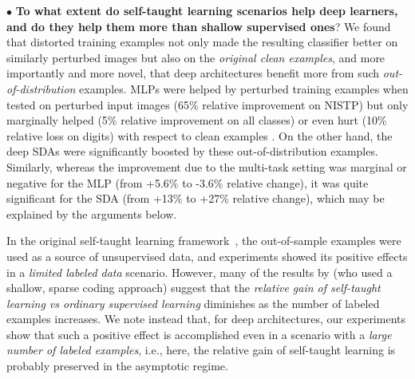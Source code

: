 \documentclass[smallcondensed]{svjour3}     %
\begin{document}
$\bullet$ %
{\bf To what extent do self-taught learning scenarios help deep learners,
and do they help them more than shallow supervised ones}?
We found that distorted training examples not only made the resulting
classifier better on similarly perturbed images but also on
the {\em original clean examples}, and more importantly and more novel,
that deep architectures benefit more from such {\em out-of-distribution}
examples. MLPs were helped by perturbed training examples when tested on perturbed input 
images (65\% relative improvement on NISTP) 
but only marginally helped (5\% relative improvement on all classes) 
or even hurt (10\% relative loss on digits)
with respect to clean examples . On the other hand, the deep SDAs
were significantly boosted by these out-of-distribution examples.
Similarly, whereas the improvement due to the multi-task setting was marginal or
negative for the MLP (from +5.6\% to -3.6\% relative change), 
it was quite significant for the SDA (from +13\% to +27\% relative change),
which may be explained by the arguments below.

In the original self-taught learning framework~\citep{RainaR2007}, the
out-of-sample examples were used as a source of unsupervised data, and
experiments showed its positive effects in a \emph{limited labeled data}
scenario. However, many of the results by \citet{RainaR2007} (who used a
shallow, sparse coding approach) suggest that the {\em relative gain of self-taught
learning vs ordinary supervised learning} diminishes as the number of labeled examples increases.
We note instead that, for deep
architectures, our experiments show that such a positive effect is accomplished
even in a scenario with a \emph{large number of labeled examples},
i.e., here, the relative gain of self-taught learning is probably preserved
in the asymptotic regime.
\end{document}
